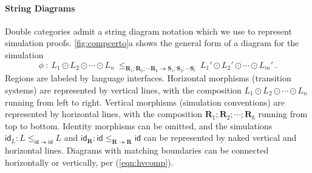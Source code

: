 \documentclass[acmsmall,screen,review,anonymous]{acmart}
\newcommand{\kw}[1]{\ensuremath{ \mathsf{#1} }}
\begin{document}

\paragraph{String Diagrams} %

Double categories admit a
string diagram notation \cite{dcsd}
which we use to represent simulation proofs.
\autoref{fig:compcerto}a shows the general form
of a diagram for the simulation
\[
  \phi \: : \:
  L_1 \odot L_2 \odot \cdots \odot L_n
  \: \le_{
    \mathbf{R}_1 \mathbin; \mathbf{R}_2 \mathbin; \cdots \mathbin \mathbf{R}_k
    \twoheadrightarrow
    \mathbf{S}_1 \mathbin; \mathbf{S}_2 \mathbin; \cdots \mathbin \mathbf{S}_l
  } \:
  L_1' \odot L_2' \odot \cdots \odot L_m'
  \,.
\]
Regions %
are labeled by language interfaces.
Horizontal morphisms (transition systems)
are represented by vertical lines,
with the composition
$L_1 \odot L_2 \odot \cdots \odot L_n$
running from left to right.
Vertical morphisms (simulation conventions)
are represented by horizontal lines,
with the composition
$\mathbf{R}_1 \mathbin; \mathbf{R}_2 \mathbin; \cdots \mathbin; \mathbf{R}_k$
running from top to bottom.
Identity morphisms can be omitted,
and the simulations
$
  \kw{id}_L :
    L \le_{\kw{id} \twoheadrightarrow \kw{id}} L
$ and $
  \kw{id}_\mathbf{R} :
    \kw{id} \le_{\mathbf{R} \twoheadrightarrow \mathbf{R}} \kw{id}
$
can be represented by naked vertical and horizontal lines.
Diagrams with matching boundaries
can be connected horizontally or vertically,
per (\ref{eqn:hvcomp}).

\end{document}
